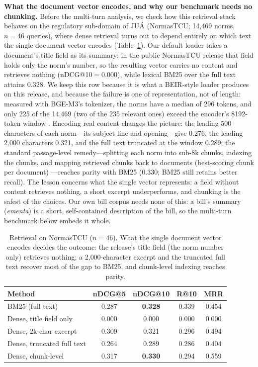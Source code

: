 \documentclass[conference]{IEEEtran}
\begin{document}
\textbf{What the document vector encodes, and why our benchmark needs no
chunking.} Before the multi-turn analysis, we check how this retrieval stack
behaves on the regulatory sub-domain of JU\'A \cite{Pereira2026JUA} (NormasTCU;
14{,}469 norms, $n{=}46$ queries), where dense retrieval turns out to depend
entirely on which text the single document vector encodes
(Table~\ref{tab:chunking}). Our default loader takes a document's title field as
its summary; in the public NormasTCU release that field holds only the norm's
number, so the resulting vector carries no content and retrieves nothing
(nDCG@10$=$0.000), while lexical BM25 over the full text attains 0.328. We keep
this row because it is what a BEIR-style loader produces on this release, and
because the failure is one of representation, not of length: measured with
BGE-M3's tokenizer, the norms have a median of 296 tokens, and only 225 of the
14{,}469 (two of the 235 relevant ones) exceed the encoder's 8192-token window
\cite{Chen2024BGEM3}. Encoding real content changes the picture: the leading
500 characters of each norm---its subject line and opening---give 0.276, the
leading 2{,}000 characters 0.321, and the full text truncated at the window
0.289; the standard passage-level remedy---splitting each norm into sub-8k
chunks, indexing the chunks, and mapping retrieved chunks back to documents
(best-scoring chunk per document) \cite{Dai2019Deeper,Karpukhin2020DPR}---reaches
parity with BM25 (0.330; BM25 still retains better recall). The lesson concerns
what the single vector represents: a field without content retrieves nothing, a
short excerpt underperforms, and chunking is the safest of the choices. Our own
bill corpus needs none of this: a bill's summary (\emph{ementa}) is a short,
self-contained description of the bill, so the multi-turn benchmark below embeds
it whole.

\begin{table}[t]
\caption{Retrieval on NormasTCU ($n{=}46$). What the single document vector
encodes decides the outcome: the release's title field (the norm number only)
retrieves nothing; a 2{,}000-character excerpt and the truncated full text recover
most of the gap to BM25, and chunk-level indexing reaches parity.}
\label{tab:chunking}
\centering\small\setlength{\tabcolsep}{2.5pt}
\begin{tabular}{lcccc}
\toprule
\textbf{Method} & \textbf{nDCG@5} & \textbf{nDCG@10} & \textbf{R@10} & \textbf{MRR} \\
\midrule
BM25 (full text)      & 0.287 & \textbf{0.328} & 0.339 & 0.454 \\
Dense, title field only & 0.000 & 0.000 & 0.000 & 0.000 \\
Dense, 2k-char excerpt & 0.309 & 0.321 & 0.296 & 0.494 \\
Dense, truncated full text & 0.264 & 0.289 & 0.286 & 0.404 \\
Dense, chunk-level    & 0.317 & \textbf{0.330} & 0.294 & 0.559 \\
\bottomrule
\end{tabular}
\end{table}
\end{document}
